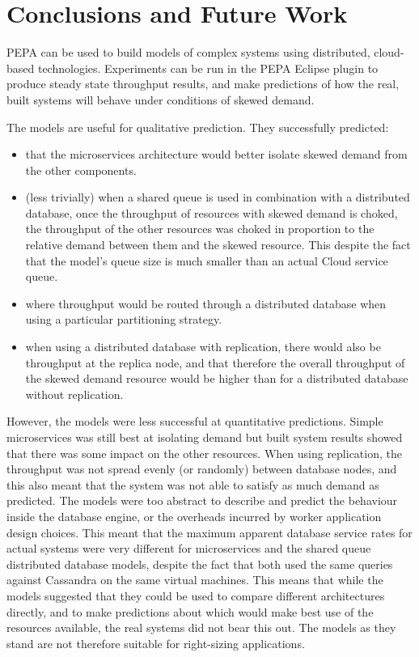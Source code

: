 %
%

\section{Conclusions and Future Work}\label{sec:conclusions}
PEPA can be used to build models of complex systems using distributed, cloud-based technologies.  Experiments can be run in the PEPA Eclipse plugin to produce steady state throughput results, and make predictions of how the real, built systems will behave under conditions of skewed demand.
	
The models are useful for qualitative prediction.  They successfully predicted:
\begin{itemize}
	\item that the microservices architecture would better isolate skewed demand from the other components.
	\item (less trivially) when a shared queue is used in combination with a distributed database, once the throughput of resources with skewed demand is choked, the throughput of the other resources was choked in proportion to the relative demand between them and the skewed resource.  This despite the fact that the model's queue size is much smaller than an actual Cloud service queue.
	\item where throughput would be routed through a distributed database when using a particular partitioning strategy.
	\item when using a distributed database with replication, there would also be throughput at the replica node, and that therefore the overall throughput of the skewed demand resource would be higher than for a distributed database without replication.
\end{itemize}

However, the models were less successful at quantitative predictions.  Simple microservices was still best at isolating demand but built system results showed that there was some impact on the other resources.  When using replication, the throughput was not spread evenly (or randomly) between database nodes, and this also meant that the system was not able to satisfy as much demand as predicted.  The models were too abstract to describe and predict the behaviour inside the database engine, or the overheads incurred by worker application design choices.  This meant that the maximum apparent database service rates for actual systems were very different for microservices and the shared queue distributed database models, despite the fact that both used the same queries against Cassandra on the same virtual machines.  This means that while the models suggested that they could be used to compare different architectures directly, and to make predictions about which would make best use of the resources available, the real systems did not bear this out.  The models as they stand are not therefore suitable for right-sizing applications.

